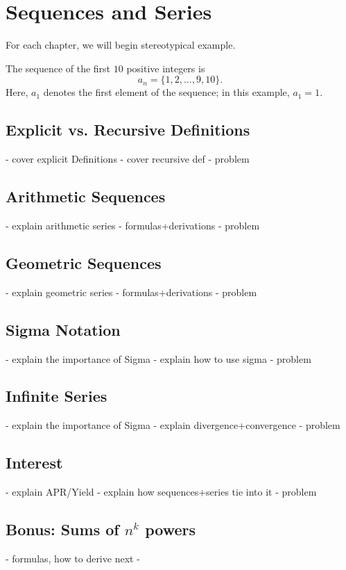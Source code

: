 \chapter{Sequences and Series}

For each chapter, we will begin stereotypical example.
\begin{example}
    The sequence of the first $10$ positive integers is
    \[a_n=\{1,2,\dots,9,10\}.\]
    Here, $a_1$ denotes the first element of the sequence; in this example, $a_1=1$.
\end{example}
\section{Explicit vs. Recursive Definitions}
- cover explicit Definitions
- cover recursive def 
- problem
\section{Arithmetic Sequences}
- explain arithmetic series
- formulas+derivations
- problem
\section{Geometric Sequences}
- explain geometric series
- formulas+derivations
- problem
\section{Sigma Notation}
- explain the importance of Sigma
- explain how to use sigma
- problem
\section{Infinite Series}
- explain the importance of Sigma
- explain divergence+convergence
- problem
\section{Interest}
- explain APR/Yield
- explain how sequences+series tie into it
- problem

\begin{subappendices}
\section{Bonus: Sums of $n^k$ powers}
    - formulas, how to derive next
    - 
\end{subappendices}